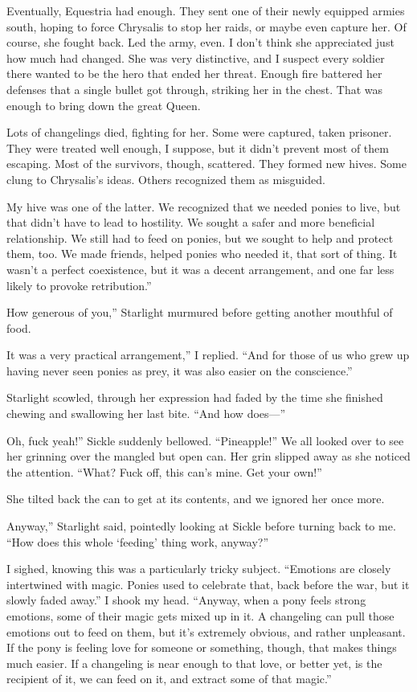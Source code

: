 \leavevmode{}Eventually, Equestria had enough. They sent one of their newly equipped armies south, hoping to force Chrysalis to stop her raids, or maybe even capture her. Of course, she fought back. Led the army, even. I don’t think she appreciated just how much had changed. She was very distinctive, and I suspect every soldier there wanted to be the hero that ended her threat. Enough fire battered her defenses that a single bullet got through, striking her in the chest. That was enough to bring down the great Queen.

\leavevmode{}Lots of changelings died, fighting for her. Some were captured, taken prisoner. They were treated well enough, I suppose, but it didn’t prevent most of them escaping. Most of the survivors, though, scattered. They formed new hives. Some clung to Chrysalis’s ideas. Others recognized them as misguided.

\leavevmode{}My hive was one of the latter. We recognized that we needed ponies to live, but that didn’t have to lead to hostility. We sought a safer and more beneficial relationship. We still had to feed on ponies, but we sought to help and protect them, too. We made friends, helped ponies who needed it, that sort of thing. It wasn’t a perfect coexistence, but it was a decent arrangement, and one far less likely to provoke retribution.”

\leavevmode{}How generous of you,” Starlight murmured before getting another mouthful of food.

\leavevmode{}It was a very practical arrangement,” I replied. “And for those of us who grew up having never seen ponies as prey, it was also easier on the conscience.”

Starlight scowled, through her expression had faded by the time she finished chewing and swallowing her last bite. “And how does—”

\leavevmode{}Oh, fuck yeah!” Sickle suddenly bellowed. “Pineapple!” We all looked over to see her grinning over the mangled but open can. Her grin slipped away as she noticed the attention. “What? Fuck off, this can’s mine. Get your own!”

She tilted back the can to get at its contents, and we ignored her once more.

\leavevmode{}Anyway,” Starlight said, pointedly looking at Sickle before turning back to me. “How does this whole ‘feeding’ thing work, anyway?”

I sighed, knowing this was a particularly tricky subject. “Emotions are closely intertwined with magic. Ponies used to celebrate that, back before the war, but it slowly faded away.” I shook my head. “Anyway, when a pony feels strong emotions, some of their magic gets mixed up in it. A changeling can pull those emotions out to feed on them, but it’s extremely obvious, and rather unpleasant. If the pony is feeling love for someone or something, though, that makes things much easier. If a changeling is near enough to that love, or better yet, is the recipient of it, we can feed on it, and extract some of that magic.”

